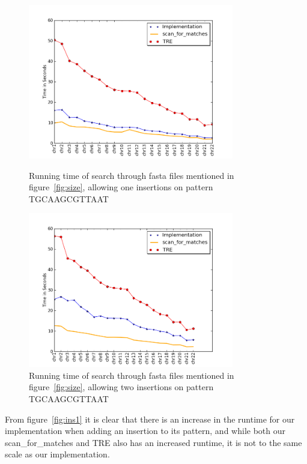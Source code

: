 \begin{figure}[h!]
\begin{minipage}[b]{0.5\linewidth}
\centering
\includegraphics[width=0.8\textwidth]{Benchmarking/1ins.png}
\caption{Running time of search through fasta files mentioned in figure~\ref{fig:size},  allowing one insertions on pattern TGCAAGCGTTAAT}
\label{fig:ins1}
\end{minipage}
\hspace{0.25cm}
\begin{minipage}[b]{0.5\linewidth}
\centering
\includegraphics[width=0.8\textwidth]{Benchmarking/2ins.png}
\caption{Running time of search through fasta files mentioned in figure~\ref{fig:size},  allowing two insertions on pattern TGCAAGCGTTAAT}
\label{fig:ins2}
\end{minipage}
\end{figure}


From figure~\ref{fig:ins1} it is clear that there is an increase in the runtime for our implementation when adding an insertion to its pattern, and while both our scan\_for\_matches and TRE also has an increased runtime, it is not to the same scale as our implementation.

